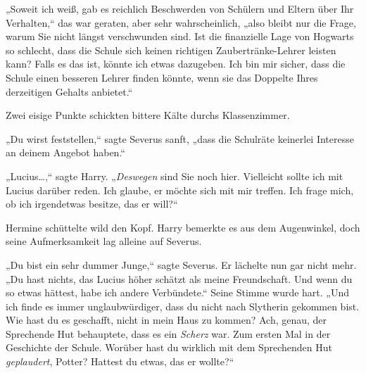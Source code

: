 „Soweit ich weiß, gab es reichlich Beschwerden von Schülern und Eltern über Ihr Verhalten,“ das war geraten, aber sehr wahrscheinlich, „also bleibt nur die Frage, warum Sie nicht längst verschwunden sind. Ist die finanzielle Lage von Hogwarts so schlecht, dass die Schule sich keinen richtigen Zaubertränke-Lehrer leisten kann? Falls es das ist, könnte ich etwas dazugeben. Ich bin mir sicher, dass die Schule einen besseren Lehrer finden könnte, wenn sie das Doppelte Ihres derzeitigen Gehalts anbietet.“

Zwei eisige Punkte schickten bittere Kälte durchs Klassenzimmer.

„Du wirst feststellen,“ sagte Severus sanft, „dass die Schulräte keinerlei Interesse an deinem Angebot haben.“

„Lucius…,“ sagte Harry. „\emph{Deswegen} sind Sie noch hier. Vielleicht sollte ich mit Lucius darüber reden. Ich glaube, er möchte sich mit mir treffen. Ich frage mich, ob ich irgendetwas besitze, das er will?“

Hermine schüttelte wild den Kopf. Harry bemerkte es aus dem Augenwinkel, doch seine Aufmerksamkeit lag alleine auf Severus.

„Du bist ein sehr dummer Junge,“ sagte Severus. Er lächelte nun gar nicht mehr. „Du hast nichts, das Lucius höher schätzt als meine Freundschaft. Und wenn du so etwas hättest, habe ich andere Verbündete.“ Seine Stimme wurde hart. „Und ich finde es immer unglaubwürdiger, dass du nicht nach Slytherin gekommen bist. Wie hast du es geschafft, nicht in mein Haus zu kommen? Ach, genau, der Sprechende Hut behauptete, dass es ein \emph{Scherz} war. Zum ersten Mal in der Geschichte der Schule. Worüber hast du wirklich mit dem Sprechenden Hut \emph{geplaudert}, Potter? Hattest du etwas, das er wollte?“

